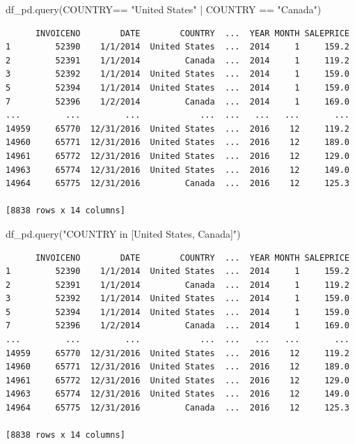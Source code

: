 \documentclass[
  letterpaper,
  DIV=11,
  numbers=noendperiod]{scrreprt}
\newenvironment{Shaded}{\begin{snugshade}}{\end{snugshade}}
\newcommand{\NormalTok}[1]{\textcolor[rgb]{0.00,0.23,0.31}{#1}}
\newcommand{\StringTok}[1]{\textcolor[rgb]{0.13,0.47,0.30}{#1}}
\begin{document}
\begin{Shaded}
\begin{Highlighting}[]
\NormalTok{df\_pd.query(}\StringTok{\textquotesingle{}COUNTRY== "United States" | COUNTRY == "Canada"\textquotesingle{}}\NormalTok{)}
\end{Highlighting}
\end{Shaded}

\begin{verbatim}
      INVOICENO        DATE        COUNTRY  ...  YEAR MONTH SALEPRICE
1         52390    1/1/2014  United States  ...  2014     1     159.2
2         52391    1/1/2014         Canada  ...  2014     1     119.2
3         52392    1/1/2014  United States  ...  2014     1     159.0
5         52394    1/1/2014  United States  ...  2014     1     159.0
7         52396    1/2/2014         Canada  ...  2014     1     169.0
...         ...         ...            ...  ...   ...   ...       ...
14959     65770  12/31/2016  United States  ...  2016    12     119.2
14960     65771  12/31/2016  United States  ...  2016    12     189.0
14961     65772  12/31/2016  United States  ...  2016    12     129.0
14963     65774  12/31/2016  United States  ...  2016    12     149.0
14964     65775  12/31/2016         Canada  ...  2016    12     125.3

[8838 rows x 14 columns]
\end{verbatim}

\begin{Shaded}
\begin{Highlighting}[]
\NormalTok{df\_pd.query(}\StringTok{"COUNTRY in [\textquotesingle{}United States\textquotesingle{}, \textquotesingle{}Canada\textquotesingle{}]"}\NormalTok{)}
\end{Highlighting}
\end{Shaded}

\begin{verbatim}
      INVOICENO        DATE        COUNTRY  ...  YEAR MONTH SALEPRICE
1         52390    1/1/2014  United States  ...  2014     1     159.2
2         52391    1/1/2014         Canada  ...  2014     1     119.2
3         52392    1/1/2014  United States  ...  2014     1     159.0
5         52394    1/1/2014  United States  ...  2014     1     159.0
7         52396    1/2/2014         Canada  ...  2014     1     169.0
...         ...         ...            ...  ...   ...   ...       ...
14959     65770  12/31/2016  United States  ...  2016    12     119.2
14960     65771  12/31/2016  United States  ...  2016    12     189.0
14961     65772  12/31/2016  United States  ...  2016    12     129.0
14963     65774  12/31/2016  United States  ...  2016    12     149.0
14964     65775  12/31/2016         Canada  ...  2016    12     125.3

[8838 rows x 14 columns]
\end{verbatim}
\end{document}
